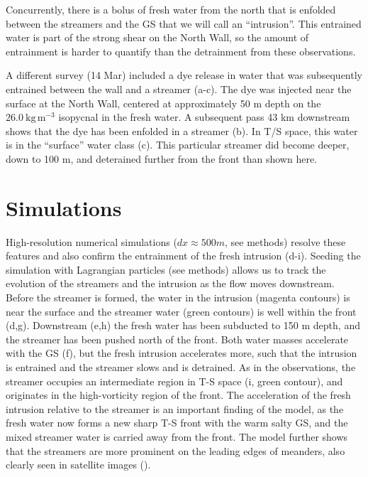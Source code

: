 \documentclass[draft,grl]{agutex2015}
\begin{document}
\begin{article}
Concurrently, there is a bolus of fresh water from the north that is enfolded between the streamers and the GS that we will call an ``intrusion''. This entrained water is part of the strong shear on the North Wall, so the amount of entrainment is harder to quantify than the detrainment from these observations.


A different survey (14 Mar) included a dye release in water that was subsequently entrained between the wall and a streamer (a-c).  The dye was injected near the surface at the North Wall, centered at approximately 50 m depth on the $26.0 \ \mathrm{kg\,m^{-3}}$ isopycnal in the fresh water.  A subsequent pass 43 km downstream shows that the dye has been enfolded in a streamer (b).  In T/S space, this water is in the ``surface'' water class (c).  This particular streamer did become deeper, down to 100 m, and deterained further from the front than shown here.  


\section{Simulations}

High-resolution numerical simulations ($dx\approx 500 m$, see methods) resolve these features and also confirm the entrainment of the fresh intrusion (d-i). Seeding the simulation with Lagrangian particles (see methods) allows us to track the evolution of the streamers and the intrusion as the flow moves downstream.  Before the streamer is formed, the water in the intrusion (magenta contours) is near the surface and the streamer water (green contours) is well within the front (d,g).  Downstream (e,h) the fresh water has been subducted to 150 m depth, and the streamer has been pushed north of the front.  Both water masses accelerate with the  GS  (f), but the fresh intrusion accelerates more, such that the intrusion is entrained and the streamer slows and is detrained.  As in the observations, the streamer occupies an intermediate region in T-S space (i, green contour), and originates in the high-vorticity region of the front.   The acceleration of the fresh intrusion relative to the streamer is an important finding of the model, as the fresh water now forms a new sharp T-S front with the warm salty GS, and the  mixed streamer water is carried away from the front.  The model further shows that the streamers are more prominent on the leading edges of meanders, also clearly seen in satellite images ().  


\end{article}
\end{document}

